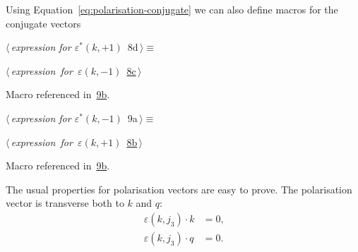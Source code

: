 \documentclass[a4paper,12pt]{amsart}
\renewcommand{\NWtarget}[2]{\hypertarget{#1}{#2}}
\renewcommand{\NWlink}[2]{\hyperlink{#1}{#2}}
\renewcommand{\NWtxtMacroRefIn}{Macro referenced in}
\renewcommand{\NWsep}{${\diamond}$}
\begin{document}
Using Equation~\eqref{eq:polarisation-conjugate} we can also
define macros for the conjugate vectors
\begin{flushleft} \small
\begin{minipage}{\linewidth}\label{scrap21}\raggedright\small
\NWtarget{nuweb8d}{} $\langle\,${\itshape expression for $\varepsilon^\ast(k, +1)$}\nobreak\ {\footnotesize {8d}}$\,\rangle\equiv$
\vspace{-1ex}
\begin{list}{}{} \item
\mbox{}\verb@@\hbox{$\langle\,${\itshape expression for $\varepsilon(k, -1)$}\nobreak\ {\footnotesize \NWlink{nuweb8c}{8c}}$\,\rangle$}\verb@@{\NWsep}
\end{list}
\vspace{-1.5ex}
\footnotesize
\begin{list}{}{\setlength{\itemsep}{-\parsep}\setlength{\itemindent}{-\leftmargin}}
\item \NWtxtMacroRefIn\ \NWlink{nuweb9b}{9b}.

\item{}
\end{list}
\end{minipage}\vspace{4ex}
\end{flushleft}
\begin{flushleft} \small
\begin{minipage}{\linewidth}\label{scrap22}\raggedright\small
\NWtarget{nuweb9a}{} $\langle\,${\itshape expression for $\varepsilon^\ast(k, -1)$}\nobreak\ {\footnotesize {9a}}$\,\rangle\equiv$
\vspace{-1ex}
\begin{list}{}{} \item
\mbox{}\verb@@\hbox{$\langle\,${\itshape expression for $\varepsilon(k, +1)$}\nobreak\ {\footnotesize \NWlink{nuweb8b}{8b}}$\,\rangle$}\verb@@{\NWsep}
\end{list}
\vspace{-1.5ex}
\footnotesize
\begin{list}{}{\setlength{\itemsep}{-\parsep}\setlength{\itemindent}{-\leftmargin}}
\item \NWtxtMacroRefIn\ \NWlink{nuweb9b}{9b}.

\item{}
\end{list}
\end{minipage}\vspace{4ex}
\end{flushleft}
The usual properties for polarisation vectors are easy to prove. The
polarisation vector is transverse both to $k$ and $q$:
\begin{align}
\varepsilon(k, j_3)\cdot k &= 0\text{,}\\
\varepsilon(k, j_3)\cdot q &= 0\text{.}
\end{align}
\end{document}
